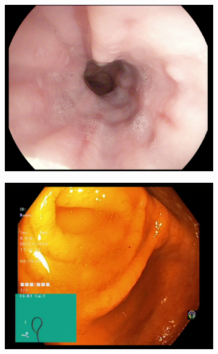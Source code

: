 \begin{figure}[t]
\begin{subfigure}[b]{0.4\textwidth}
            \caption[Hate to be this guy]%
            {{\small }}    
            \label{fig:polypGAN}
        \end{subfigure}
        \qquad\vfill%
        \begin{subfigure}[b]{0.4\textwidth}   
            \centering 
            \includegraphics[width=\textwidth]{experiments/images/esophagitis.jpg}
            \caption[]%
            {{\small }}    
            \label{fig:zAE}
        \end{subfigure}
        \qquad%
        \begin{subfigure}[b]{0.4\textwidth}   
            \centering 
            \includegraphics[width=\textwidth]{experiments/images/normal-cecum.jpg}

\end{subfigure}
\end{figure}
